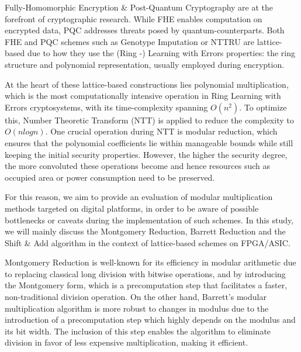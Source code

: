 \documentclass[11pt,
  titlepage=false,
  abstract=on,
]{scrreprt}
\begin{document}
Fully-Homomorphic Encryption \& Post-Quantum Cryptography are at the forefront of cryptographic research. While FHE enables computation on encrypted data, PQC
addresses threats posed by quantum-counterparts. Both FHE and PQC schemes such as Genotype Imputation \cite{gursoy2022privacy} or NTTRU \cite{cryptoeprint:2019/040} are 
lattice-based due to how they use the (Ring -) Learning with Errors properties: the ring structure and polynomial representation, usually employed during encryption.

At the heart of these lattice-based constructions lies polynomial multiplication, which is the most computationally intensive operation in Ring Learning 
with Errors cryptosystems, with its time-complexity spanning $O(n^{2})$. To optimize this, Number Theoretic Transform (NTT) is applied to reduce the complexity to $O(nlogn)$.
One crucial operation during NTT is modular reduction, which ensures that the polynomial coefficients lie within manageable bounds while still keeping the initial 
security properties. However, the higher the security degree, the more convoluted these operations become and hence resources such as occupied area or power consumption 
need to be preserved.

For this reason, we aim to provide an evaluation of modular multiplication methods targeted on digital platforms, in order to be aware of possible bottlenecks 
or caveats during the implementation of such schemes. In this study, we will mainly discuss the Montgomery Reduction, Barrett Reduction and the Shift \& Add algorithm
in the context of lattice-based schemes on FPGA/ASIC.


Montgomery Reduction \cite{montgomery1985modular} is well-known for its efficiency in modular arithmetic due to replacing classical long division with bitwise operations, and by introducing the Montgomery form,
which is a precomputation step that facilitates a faster, non-traditional division operation.
On the other hand, Barrett's modular multiplication algorithm \cite{barrett1986implementing} is more robust to changes in modulus due to the introduction of a precomputation step which highly depends on the modulus and
its bit width. The inclusion of this step enables the algorithm to eliminate division in favor of less expensive multiplication, making it efficient.
\end{document}
